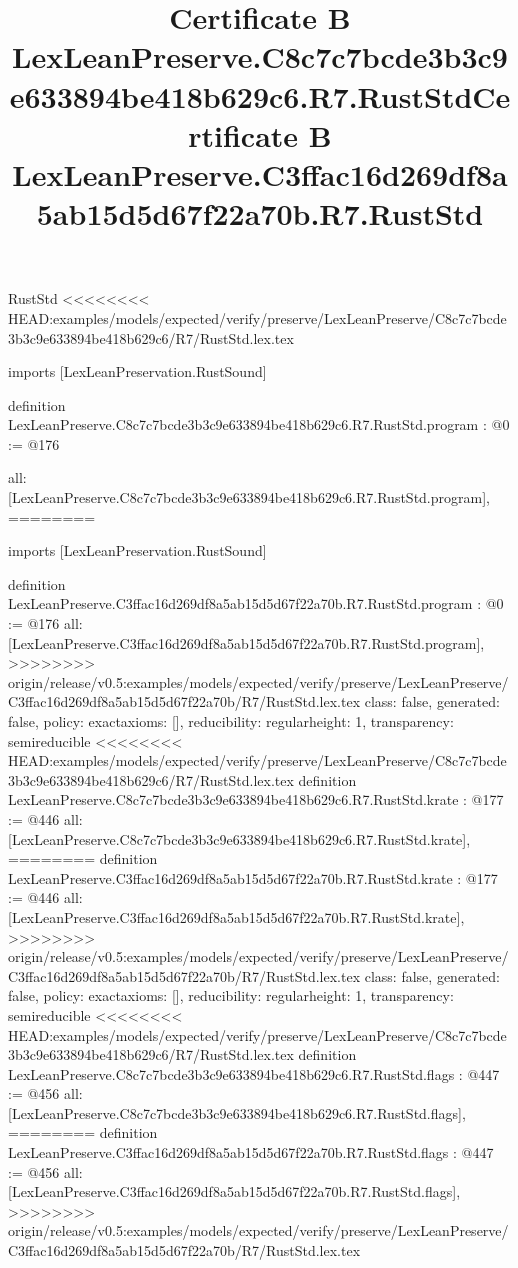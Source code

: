 \begin{lexlean}{RustStd}
<<<<<<<< HEAD:examples/models/expected/verify/preserve/LexLeanPreserve/C8c7c7bcde3b3c9e633894be418b629c6/R7/RustStd.lex.tex
\title{Certificate B LexLeanPreserve.C8c7c7bcde3b3c9e633894be418b629c6.R7.RustStd}
\begin{coremodule}
imports [LexLeanPreservation.RustSound]

definition LexLeanPreserve.C8c7c7bcde3b3c9e633894be418b629c6.R7.RustStd.program : @0 := @176 {
  all: [LexLeanPreserve.C8c7c7bcde3b3c9e633894be418b629c6.R7.RustStd.program],
========
\title{Certificate B LexLeanPreserve.C3ffac16d269df8a5ab15d5d67f22a70b.R7.RustStd}
\begin{coremodule}
imports [LexLeanPreservation.RustSound]

definition LexLeanPreserve.C3ffac16d269df8a5ab15d5d67f22a70b.R7.RustStd.program : @0 := @176 {
  all: [LexLeanPreserve.C3ffac16d269df8a5ab15d5d67f22a70b.R7.RustStd.program],
>>>>>>>> origin/release/v0.5:examples/models/expected/verify/preserve/LexLeanPreserve/C3ffac16d269df8a5ab15d5d67f22a70b/R7/RustStd.lex.tex
  class: false,
  generated: false,
  policy: exact{axioms: []},
  reducibility: regular{height: 1},
  transparency: semireducible
}
<<<<<<<< HEAD:examples/models/expected/verify/preserve/LexLeanPreserve/C8c7c7bcde3b3c9e633894be418b629c6/R7/RustStd.lex.tex
definition LexLeanPreserve.C8c7c7bcde3b3c9e633894be418b629c6.R7.RustStd.krate : @177 := @446 {
  all: [LexLeanPreserve.C8c7c7bcde3b3c9e633894be418b629c6.R7.RustStd.krate],
========
definition LexLeanPreserve.C3ffac16d269df8a5ab15d5d67f22a70b.R7.RustStd.krate : @177 := @446 {
  all: [LexLeanPreserve.C3ffac16d269df8a5ab15d5d67f22a70b.R7.RustStd.krate],
>>>>>>>> origin/release/v0.5:examples/models/expected/verify/preserve/LexLeanPreserve/C3ffac16d269df8a5ab15d5d67f22a70b/R7/RustStd.lex.tex
  class: false,
  generated: false,
  policy: exact{axioms: []},
  reducibility: regular{height: 1},
  transparency: semireducible
}
<<<<<<<< HEAD:examples/models/expected/verify/preserve/LexLeanPreserve/C8c7c7bcde3b3c9e633894be418b629c6/R7/RustStd.lex.tex
definition LexLeanPreserve.C8c7c7bcde3b3c9e633894be418b629c6.R7.RustStd.flags : @447 := @456 {
  all: [LexLeanPreserve.C8c7c7bcde3b3c9e633894be418b629c6.R7.RustStd.flags],
========
definition LexLeanPreserve.C3ffac16d269df8a5ab15d5d67f22a70b.R7.RustStd.flags : @447 := @456 {
  all: [LexLeanPreserve.C3ffac16d269df8a5ab15d5d67f22a70b.R7.RustStd.flags],
>>>>>>>> origin/release/v0.5:examples/models/expected/verify/preserve/LexLeanPreserve/C3ffac16d269df8a5ab15d5d67f22a70b/R7/RustStd.lex.tex
}}}
\end{coremodule}}
\end{coremodule}
\end{lexlean}
